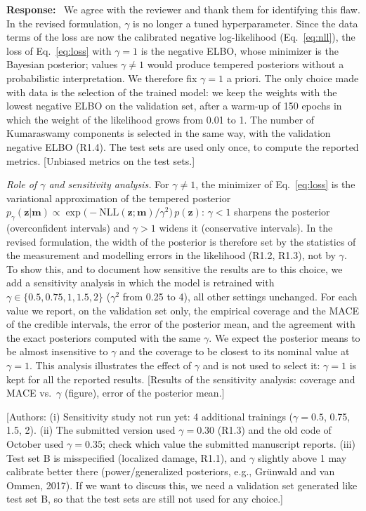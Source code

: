\documentclass[11pt]{article}
\newenvironment{response}{\par\smallskip\noindent\color{resp}\textbf{Response:}\ }{\par}
\newcommand{\authornote}[1]{\textcolor{note}{\textsf{[Authors: #1]}}}
\newcommand{\tbd}[1]{\textcolor{note}{\textsf{[#1]}}}
\newcommand{\m}{\mathbf{m}}
\newcommand{\z}{\mathbf{z}}
\begin{document}
\begin{response}
We agree with the reviewer and thank them for identifying this flaw. In the revised formulation, $\gamma$ is no longer
a tuned hyperparameter. Since the data terms of the loss are now the calibrated negative log-likelihood
(Eq.~\eqref{eq:nll}), the loss of Eq.~\eqref{eq:loss} with $\gamma=1$ is the negative ELBO, whose minimizer is the
Bayesian posterior; values $\gamma\neq1$ would produce tempered posteriors without a probabilistic interpretation. We
therefore fix $\gamma=1$ a priori. The only choice made with data is the selection of the trained model: we keep the
weights with the lowest negative ELBO on the validation set, after a warm-up of 150 epochs in which the weight of the
likelihood grows from 0.01 to 1. The number of Kumaraswamy components is selected in the same way, with the
validation negative ELBO (R1.4). The test sets are used only once, to compute the reported metrics.
\tbd{Unbiased metrics on the test sets.}

\textit{Role of $\gamma$ and sensitivity analysis.} For $\gamma\neq1$, the minimizer of Eq.~\eqref{eq:loss} is the
variational approximation of the tempered posterior $p_\gamma(\z|\m)\propto\exp\big(-\mathrm{NLL}(\z;\m)/\gamma^2\big)\,
p(\z)$: $\gamma<1$ sharpens the posterior (overconfident intervals) and $\gamma>1$ widens it (conservative intervals).
In the revised formulation, the width of the posterior is therefore set by the statistics of the measurement and
modelling errors in the likelihood (R1.2, R1.3), not by $\gamma$. To show this, and to document how sensitive the
results are to this choice, we add a sensitivity analysis in which the model is retrained with
$\gamma\in\{0.5,0.75,1,1.5,2\}$ ($\gamma^2$ from 0.25 to 4), all other settings unchanged. For each value we report,
on the validation set only, the empirical coverage and the MACE of the credible intervals, the error of the posterior
mean, and the agreement with the exact posteriors computed with the same $\gamma$. We expect the posterior means to be
almost insensitive to $\gamma$ and the coverage to be closest to its nominal value at $\gamma=1$. This analysis
illustrates the effect of $\gamma$ and is not used to select it: $\gamma=1$ is kept for all the reported results.
\tbd{Results of the sensitivity analysis: coverage and MACE vs.\ $\gamma$ (figure), error of the posterior mean.}
\end{response}
\authornote{(i) Sensitivity study not run yet: 4 additional trainings ($\gamma=0.5$, 0.75, 1.5, 2). (ii) The submitted
version used $\gamma=0.30$ (R1.3) and the old code of October used $\gamma=0.35$; check which value the submitted manuscript
reports. (iii) Test set B is misspecified (localized damage, R1.1), and $\gamma$ slightly above 1 may calibrate better
there (power/generalized posteriors, e.g., Gr\"unwald and van Ommen, 2017). If we want to discuss this, we need a
validation set generated like test set B, so that the test sets are still not used for any choice.}
\end{document}
